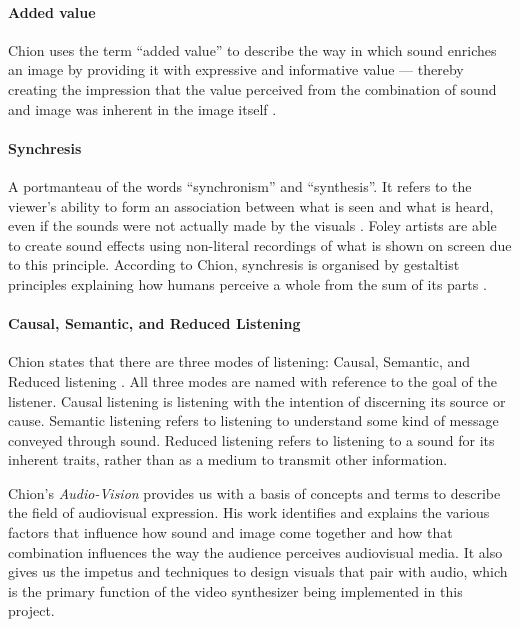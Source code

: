 \documentclass[../initial_thesis.tex]{subfiles}
\begin{document}
\paragraph{Added value} Chion uses the term ``added value'' to describe the way in which sound enriches an image by providing it with expressive and informative value --- thereby creating the impression that the value perceived from the combination of sound and image was inherent in the image itself \cite{Chion1994}.

\paragraph{Synchresis} A portmanteau of the words ``synchronism'' and ``synthesis''. It refers to the viewer's ability to form an association between what is seen and what is heard, even if the sounds were not actually made by the visuals \cite{Chion1994}. Foley artists are able to create sound effects using non-literal recordings of what is shown on screen due to this principle. According to Chion, synchresis is organised by gestaltist principles explaining how humans perceive a whole from the sum of its parts \cite{Chion1994}.

\paragraph{Causal, Semantic, and Reduced Listening} Chion states that there are three modes of listening: Causal, Semantic, and Reduced listening \cite{Chion1994}. All three modes are named with reference to the goal of the listener. Causal listening is listening with the intention of discerning its source or cause. Semantic listening refers to listening to understand some kind of message conveyed through sound. Reduced listening refers to listening to a sound for its inherent traits, rather than as a medium to transmit other information. \par

Chion's \textit{Audio-Vision} provides us with a basis of concepts and terms to describe the field of audiovisual expression. His work identifies and explains the various factors that influence how sound and image come together and how that combination influences the way the audience perceives audiovisual media. It also gives us the impetus and techniques to design visuals that pair with audio, which is the primary function of the video synthesizer being implemented in this project.
\end{document}
